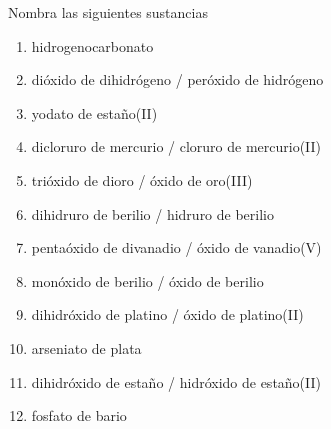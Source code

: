 \begin{exercise}[
    tags    = {inorgánica,nomenclatura,múltiple,2B},
    topics  = {química inorgánica,formulación,nomenclatura},
    source  = {Química 2B SAN 2016, p372, e9},
  ]
  Nombra las siguientes sustancias

  \begin{enumerate}\begin{multicols}{2}
    \item {}
    \item {}
    \item {}
    \item {}
    \item {}
    \item {}
    \item {}
    \item {}
    \item {}
    \item {}
    \item {}
    \item {}
  \end{multicols}\end{enumerate}
\end{exercise}

\begin{solution}
  \begin{enumerate}
    \item hidrogenocarbonato
    \item dióxido de dihidrógeno / peróxido de hidrógeno
    \item yodato de estaño(II)
    \item dicloruro de mercurio / cloruro de mercurio(II)
    \item trióxido de dioro / óxido de oro(III)
    \item dihidruro de berilio / hidruro de berilio
    \item pentaóxido de divanadio / óxido de vanadio(V)
    \item monóxido de berilio / óxido de berilio
    \item dihidróxido de platino / óxido de platino(II)
    \item arseniato de plata
    \item dihidróxido de estaño / hidróxido de estaño(II)
    \item fosfato de bario
  \end{enumerate}
\end{solution}





